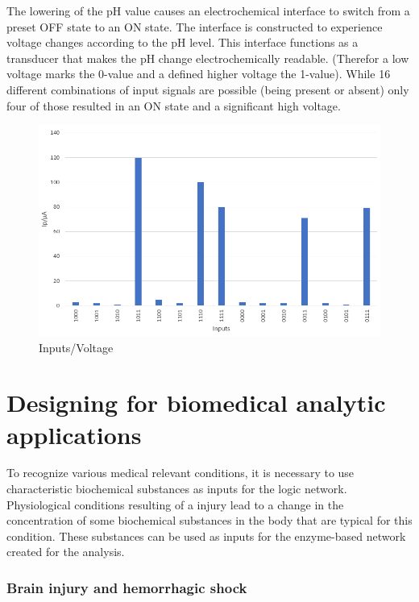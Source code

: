 \documentclass[runningheads]{llncs}
\begin{document}
				

		The lowering of the pH value causes an electrochemical interface to switch from a preset OFF state to an ON state. 
		The interface is constructed to experience voltage changes according to the pH level. This interface functions as a transducer that makes the pH change electrochemically readable. (Therefor a low voltage marks the 0-value and a defined higher voltage the 1-value). While 16 different combinations of input signals are possible (being present or absent) only four of those resulted in an ON state and a significant high voltage. \cite{original}
		
	
		\begin{figure}[H] \centering \includegraphics[scale= 0.36]{pics/pH.png} \caption{Inputs/Voltage} \label{img:ph} \end{figure}
	
	

\section{Designing for biomedical analytic applications}
	To recognize various medical relevant conditions, it is necessary to use characteristic biochemical substances as inputs for the logic network.
	Physiological conditions resulting of a injury lead to a change in the concentration of some biochemical substances in the body that are typical for this condition. These substances can be used as inputs for the enzyme-based network created for the analysis.
	
	
	\subsubsection{Brain injury and hemorrhagic shock}
	
\end{document}
